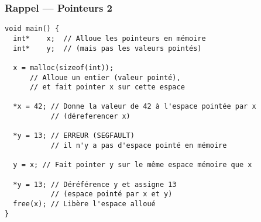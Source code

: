 \documentclass[12pt,svgnames]{beamer}
\begin{document}
\begin{frame}[fragile=singleslide]
	\frametitle{Rappel --- Pointeurs 2}
	\begin{adjustwidth}{-0.5em}{0em}
		\begin{verbatim}
void main() {   
  int*    x;  // Alloue les pointeurs en mémoire 
  int*    y;  // (mais pas les valeurs pointés)

  x = malloc(sizeof(int));
      // Alloue un entier (valeur pointé),
      // et fait pointer x sur cette espace
    
  *x = 42; // Donne la valeur de 42 à l'espace pointée par x
           // (déreferencer x)

  *y = 13; // ERREUR (SEGFAULT)
           // il n'y a pas d'espace pointé en mémoire

  y = x; // Fait pointer y sur le même espace mémoire que x
    
  *y = 13; // Déréférence y et assigne 13
           // (espace pointé par x et y)
  free(x); // Libère l'espace alloué
}
		\end{verbatim}
	\end{adjustwidth}
\end{frame}


\end{document}

